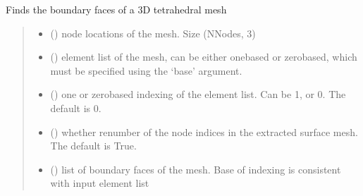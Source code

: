 \documentclass[letterpaper,10pt,english]{sphinxmanual}
\begin{document}
\begin{fulllineitems}
\label{\detokenize{_autosummary/nirfasterff.meshing.meshutils.boundfaces:nirfasterff.meshing.meshutils.boundfaces}}
\pysigstartsignatures
\pysiglinewithargsret
{}
{\sphinxparamcomma {}\sphinxparamcomma {}\sphinxparamcomma {}}
{}
\pysigstopsignatures
\sphinxAtStartPar
Finds the boundary faces of a 3D tetrahedral mesh
\begin{quote}\begin{description}
\begin{itemize}
\item {} 
\sphinxAtStartPar
{} () \textendash{} node locations of the mesh. Size (NNodes, 3)

\item {} 
\sphinxAtStartPar
{} () \textendash{} element list of the mesh, can be either one\sphinxhyphen{}based or zero\sphinxhyphen{}based, which must be specified using the ‘base’ argument.

\item {} 
\sphinxAtStartPar
{} (\sphinxstyleliteralemphasis{\sphinxupquote{, }}) \textendash{} one\sphinxhyphen{} or zero\sphinxhyphen{}based indexing of the element list. Can be 1, or 0. The default is 0.

\item {} 
\sphinxAtStartPar
{} (\sphinxstyleliteralemphasis{\sphinxupquote{, }}) \textendash{} whether renumber of the node indices in the extracted surface mesh. The default is True.

\end{itemize}

\sphinxAtStartPar
\begin{itemize}
\item {} 
\sphinxAtStartPar
{} () \textendash{} list of boundary faces of the mesh. Base of indexing is consistent with input element list


\end{itemize}
\end{description}
\end{quote}
\end{fulllineitems}
\end{document}
